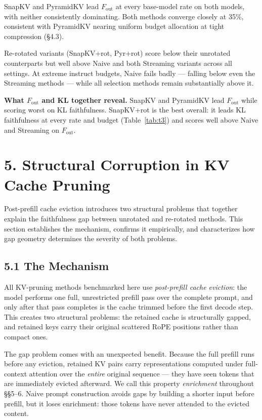 \documentclass[10pt,letterpaper]{article}
\begin{document}
SnapKV and PyramidKV lead \(F_{\text{out}}\) at every base-model rate on both models, with neither consistently dominating. Both methods converge closely at 35\%, consistent with PyramidKV nearing uniform budget allocation at tight compression (§4.3).

Re-rotated variants (SnapKV+rot, Pyr+rot) score below their unrotated counterparts but well above Naive and both Streaming variants across all settings. At extreme instruct budgets, Naive fails badly --- falling below even the Streaming methods --- while all selection methods remain substantially above it.

\textbf{What \(F_{\text{out}}\) and KL together reveal.} SnapKV and
PyramidKV lead \(F_{\text{out}}\) while scoring worst on KL faithfulness.
SnapKV+rot is the best overall: it leads KL faithfulness at every rate and budget (Table~\ref{tab:t3}) and scores well above Naive and Streaming on \(F_{\text{out}}\).

\hypertarget{structural-corruption-in-kv-cache-pruning}{%
\section{5. Structural Corruption in KV Cache Pruning}\label{structural-corruption-in-kv-cache-pruning}}

Post-prefill cache eviction introduces two structural problems that together explain the
faithfulness gap between unrotated and re-rotated methods. This section establishes the
mechanism, confirms it empirically, and characterizes how gap geometry determines the
severity of both problems.

\hypertarget{the-mechanism}{%
\subsection{5.1 The Mechanism}\label{the-mechanism}}

All KV-pruning methods benchmarked here use \emph{post-prefill cache
eviction}: the model performs one full, unrestricted prefill pass over
the complete prompt, and only after that pass completes is the cache
trimmed before the first decode step. This creates two structural
problems: the retained cache is structurally gapped, and retained keys
carry their original scattered RoPE positions rather than compact ones.

The gap problem comes with an unexpected benefit. Because the full
prefill runs before any eviction, retained KV pairs carry
representations computed under full-context attention over the
\emph{entire} original sequence --- they have seen tokens that are
immediately evicted afterward. We call this property \emph{enrichment}
throughout §§5--6. Naive prompt construction avoids gaps by building a
shorter input before prefill, but it loses enrichment: those tokens
have never attended to the evicted content.
\end{document}
